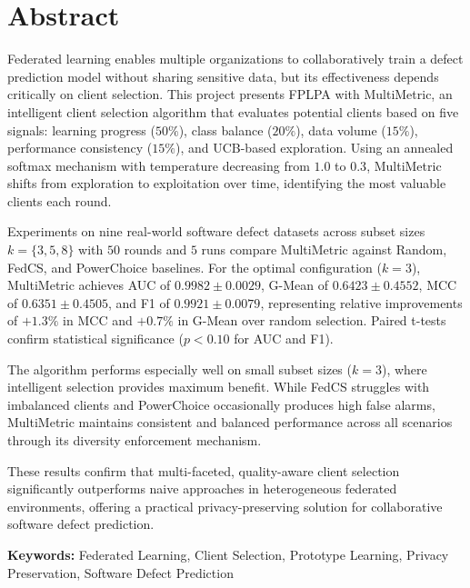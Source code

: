 \chapter*{Abstract}
Federated learning enables multiple organizations to collaboratively train a defect prediction model without sharing sensitive data, but its effectiveness depends critically on client selection. This project presents FPLPA with MultiMetric, an intelligent client selection algorithm that evaluates potential clients based on five signals: learning progress ($50\%$), class balance ($20\%$), data volume ($15\%$), performance consistency ($15\%$), and UCB-based exploration. Using an annealed softmax mechanism with temperature decreasing from $1.0$ to $0.3$, MultiMetric shifts from exploration to exploitation over time, identifying the most valuable clients each round.

Experiments on nine real-world software defect datasets across subset sizes $k = \{3, 5, 8\}$ with $50$ rounds and $5$ runs compare MultiMetric against Random, FedCS, and PowerChoice baselines. For the optimal configuration ($k=3$), MultiMetric achieves AUC of $0.9982 \pm 0.0029$, G-Mean of $0.6423 \pm 0.4552$, MCC of $0.6351 \pm 0.4505$, and F1 of $0.9921 \pm 0.0079$, representing relative improvements of $+1.3\%$ in MCC and $+0.7\%$ in G-Mean over random selection. Paired t-tests confirm statistical significance ($p < 0.10$ for AUC and F1).

The algorithm performs especially well on small subset sizes ($k=3$), where intelligent selection provides maximum benefit. While FedCS struggles with imbalanced clients and PowerChoice occasionally produces high false alarms, MultiMetric maintains consistent and balanced performance across all scenarios through its diversity enforcement mechanism.

These results confirm that multi-faceted, quality-aware client selection significantly outperforms naive approaches in heterogeneous federated environments, offering a practical privacy-preserving solution for collaborative software defect prediction.

\textbf{Keywords:} Federated Learning, Client Selection, Prototype Learning, Privacy Preservation, Software Defect Prediction